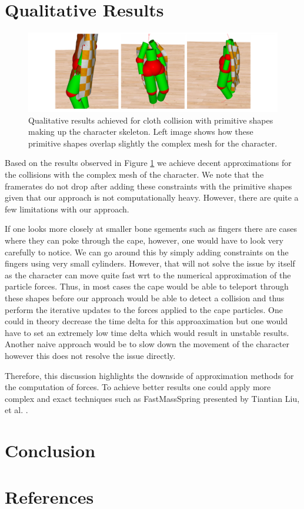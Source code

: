 \documentclass{article}
\begin{document}
\section{Qualitative Results} \label{sec:/results}

\begin{figure}[ht]
  \centering
  \includegraphics[width=\linewidth]{figs/qualitative_results.pdf}
  \caption{Qualitative results achieved for cloth collision with primitive shapes making up the character skeleton.
  Left image shows how these primitive shapes overlap slightly the complex mesh for the character.}
  \label{fig:results/results}
\end{figure}

Based on the results observed in Figure \ref{fig:results/results} we achieve decent approximations for the
collisions with the complex mesh of the character. We note that the framerates do not drop after adding these
constraints with the primitive shapes given that our approach is not computationally heavy. However, there are
quite a few limitations with our approach.

If one looks more closely at smaller bone sgements such as fingers there are cases where they can poke through
the cape, however, one would have to look very carefully to notice. We can go around this by simply adding constraints
on the fingers using very small cylinders. However, that will not solve the issue by itself as the character can move
quite fast wrt to the numerical approximation of the particle forces. Thus, in most cases the cape would be able to
teleport through these shapes before our approach would be able to detect a collision and thus perform the iterative
updates to the forces applied to the cape particles. One could in theory decrease the time delta for this approaximation
but one would have to set an extremely low time delta which would result in unstable results. Another naive approach
would be to slow down the movement of the character however this does not resolve the issue directly.

Therefore, this discussion highlights the downside of approximation methods for the computation of forces. To achieve
better results one could apply more complex and exact techniques such as FastMassSpring presented by Tiantian Liu, et al.
\cite{FastMassSpring}.



\section{Conclusion}


\section*{References}


{
  \small
}

\end{document}
